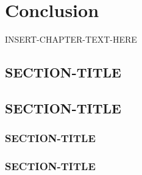 \chapter{Conclusion}
\thispagestyle{plain}

\label{ch:conclusion}

INSERT-CHAPTER-TEXT-HERE

\section{SECTION-TITLE}
\label{SECTION-LABEL}

\section{SECTION-TITLE}
\label{SECTION-LABEL}

\subsection{SECTION-TITLE}
\label{SECTION-LABEL}

\subsection{SECTION-TITLE}
\label{SECTION-LABEL}
